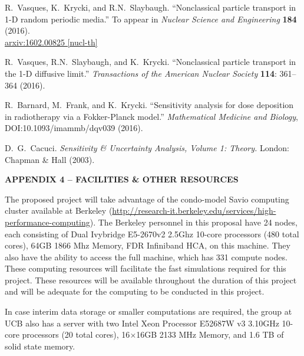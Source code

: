 \documentclass[12pt]{article}
\begin{document}
\begin{thebibliography}{10}
R.~Vasques, K.~Krycki, and R.N.~Slaybaugh.
``Nonclassical particle transport in 1-D random periodic media.''
To appear in \textit{Nuclear Science and Engineering} \textbf{184} (2016).\\
\href{http://arxiv.org/pdf/1602.00825v2.pdf}{arxiv:1602.00825 [nucl-th]} \vspace{-5pt}

R.~Vasques, R.N.~Slaybaugh, and K.~Krycki.
``Nonclassical particle transport in the 1-D diffusive limit.''
\textit{Transactions of the American Nuclear Society} \textbf{114}: 361--364 (2016).
\vspace{-5pt}

R.~Barnard, M.~Frank, and K.~Krycki.
``Sensitivity analysis for dose deposition in radiotherapy via a Fokker-Planck model.''
\textit{Mathematical Medicine and Biology}, DOI:10.1093/imammb/dqv039 (2016).
\vspace{-5pt}

D.~G.~Cacuci. \textit{Sensitivity \& Uncertainty Analysis, Volume 1: Theory.}
London: Chapman \& Hall (2003).


\end{thebibliography}

\pagebreak


\begin{center}
{\bf APPENDIX 4 -- FACILITIES \& OTHER RESOURCES}
\end{center}

The proposed project will take advantage of the condo-model Savio computing cluster available at Berkeley (\href{http://research-it.berkeley.edu/services/high-performance-computing}{http://research-it.berkeley.edu/services/high-performance-computing}). The Berkeley personnel in this proposal have 24 nodes, each consisting of Dual Ivybridge E5-2670v2 2.5Ghz 10-core processors (480 total cores), 64GB 1866 Mhz Memory, FDR Infiniband HCA, on this machine. They also have the ability to access the full machine, which has 331 compute nodes. These computing resources will facilitate the fast simulations required for this project. These resources will be available throughout the duration of this project and will be adequate for the computing to be conducted in this project. 

In case interim data storage or smaller computations are required, the group at UCB also has a server with two Intel Xeon Processor E5­2687W v3 3.10GHz 10-core processors (20 total cores), 16$\times$16GB 2133 MHz Memory, and 1.6 TB of solid state memory.
\end{document}
